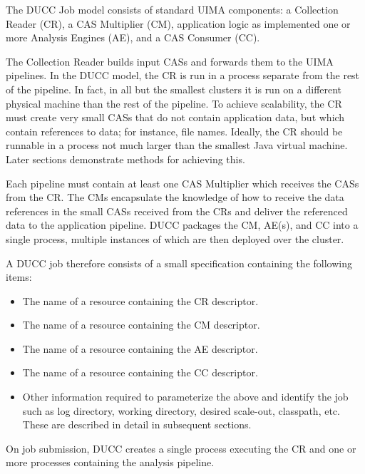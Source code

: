     The DUCC Job model consists of standard UIMA components: a Collection Reader (CR), a CAS
    Multiplier (CM), application logic as implemented one or more Analysis Engines (AE), and a CAS
    Consumer (CC).

    The Collection Reader builds input CASs and forwards them to the UIMA pipelines.  In the DUCC
    model, the CR is run in a process separate from the rest of the pipeline. In fact, in all but the
    smallest clusters it is run on a different physical machine than the rest of the pipeline.  To
    achieve scalability, the CR must create very small CASs that do not contain application data,
    but which contain references to data; for instance, file names.  Ideally, the CR should be
    runnable in a process not much larger than the smallest Java virtual machine.  Later sections
    demonstrate methods for achieving this.

    Each pipeline must contain at least one CAS Multiplier which receives the CASs from the CR.  The
    CMs encapsulate the knowledge of how to receive the data references in the small CASs received
    from the CRs and deliver the referenced data to the application pipeline.  DUCC packages the CM,
    AE(s), and CC into a single process, multiple instances of which are then deployed over the
    cluster.

    A DUCC job therefore consists of a small specification containing the following items:
    
    \begin{itemize}
      \item The name of a resource containing the CR descriptor.
      \item The name of a resource containing the CM descriptor.
      \item The name of a resource containing the AE descriptor.
      \item The name of a resource containing the CC descriptor.
      \item Other information required to parameterize the above and identify the job
        such as log directory, working directory, desired scale-out, classpath, etc.
        These are described in detail in subsequent sections.
    \end{itemize}

    On job submission, DUCC creates a single process executing the CR and
    one or more processes containing the analysis pipeline.

